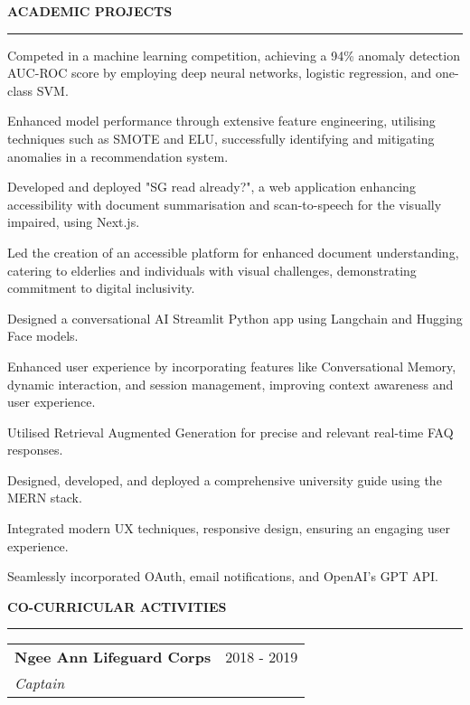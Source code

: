 \documentclass[11pt,letterpaper]{article}
\makeatletter
\newcommand{\resheading}[1]{%
  \vspace{2pt}
  {\normalsize \textbf{\MakeUppercase{#1}}}\\
  \vspace{-8pt}
  \hrule
}
\newcommand{\resitem}[1]{\item \small #1 \vspace{-2pt}}
\newcommand{\ressubheading}[4]{
    \vspace{2pt}
    \begin{tabular*}{\textwidth}{l@{\extracolsep{\fill}}r}
        \small \textbf{#1} & \small #2 \\
        \small \textit{#3} & \small \textit{#4} \\
    \end{tabular*}\vspace{-3pt}}
\makeatother
\begin{document}
\resheading{Academic Projects}
\begin{leftitemize}
\item[]
\begin{subitemize}
    \resitem{Competed in a machine learning competition, achieving a 94\% anomaly detection AUC-ROC score by employing deep neural networks, logistic regression, and one-class SVM.}
    \resitem{Enhanced model performance through extensive feature engineering, utilising techniques such as SMOTE and ELU, successfully identifying and mitigating anomalies in a recommendation system.}
\end{subitemize}

\item[]
\begin{subitemize}
    \resitem{Developed and deployed "SG read already?", a web application enhancing accessibility with document summarisation and scan-to-speech for the visually impaired, using Next.js.}
    \resitem{Led the creation of an accessible platform for enhanced document understanding, catering to elderlies and individuals with visual challenges, demonstrating commitment to digital inclusivity.}
\end{subitemize}

\item[]
\begin{subitemize}
    \resitem{Designed a conversational AI Streamlit Python app using Langchain and Hugging Face models.}
    \resitem{Enhanced user experience by incorporating features like Conversational Memory, dynamic interaction, and session management, improving context awareness and user experience.}
    \resitem{Utilised Retrieval Augmented Generation for precise and relevant real-time FAQ responses.}
\end{subitemize}

\item[]
\begin{subitemize}
    \resitem{Designed, developed, and deployed a comprehensive university guide using the MERN stack.}
    \resitem{Integrated modern UX techniques, responsive design, ensuring an engaging user experience.}
    \resitem{Seamlessly incorporated OAuth, email notifications, and OpenAI's GPT API.}
\end{subitemize}
\end{leftitemize}

\resheading{CO-CURRICULAR ACTIVITIES}
\begin{leftitemize}
\item[]

\item[]
\ressubheading{Ngee Ann Lifeguard Corps}{2018 - 2019}{Captain}{}
\end{leftitemize}
\end{document}
